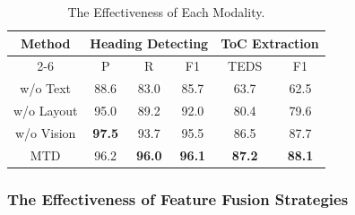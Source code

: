 \documentclass[a4paper,conference]{IEEEtran}
\begin{document}

\begin{table}[]
\caption{The Effectiveness of Each Modality.}
\label{tablemodal}
\centering
\begin{tabular}{c|ccc|cc}
\hline
\multirow{2}{*}{Method} & \multicolumn{3}{c|}{Heading Detecting} & \multicolumn{2}{c}{ToC Extraction} \\ \cline{2-6} 
 & \multicolumn{1}{c|}{P} & \multicolumn{1}{c|}{R} & F1 & TEDS & F1 \\ \hline
w/o Text & \multicolumn{1}{c|}{88.6} & \multicolumn{1}{c|}{83.0} & 85.7 & 63.7 & 62.5 \\
w/o Layout & \multicolumn{1}{c|}{95.0} & \multicolumn{1}{c|}{89.2} & 92.0 & 80.4 & 79.6 \\
w/o Vision & \multicolumn{1}{c|}{\textbf{97.5}} & \multicolumn{1}{c|}{93.7} & 95.5 & 86.5 & 87.7 \\ \hline
MTD & \multicolumn{1}{c|}{96.2} & \multicolumn{1}{c|}{\textbf{96.0}} & \textbf{96.1} & \textbf{87.2} & \textbf{88.1} \\ \hline
\end{tabular}
\end{table}


\subsubsection{The Effectiveness of Feature Fusion Strategies}
\end{document}
